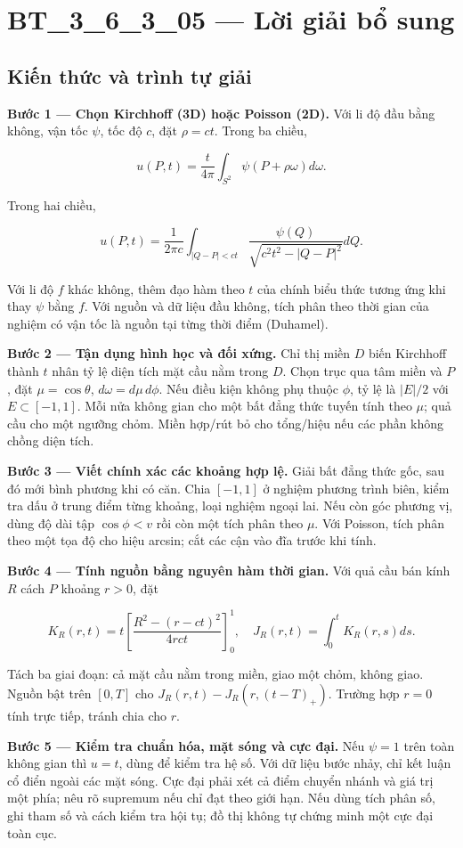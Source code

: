 \documentclass[10pt,a4paper]{article}
\begin{document}
\section*{BT\_3\_6\_3\_05 — Lời giải bổ sung}
\subsection*{Kiến thức và trình tự giải}
\textbf{Bước 1 — Chọn Kirchhoff (3D) hoặc Poisson (2D).} Với li độ đầu bằng không, vận tốc $\psi$, tốc độ $c$, đặt $\rho=ct$. Trong ba chiều,


\[
u(P,t)=\frac t{4\pi}\int_{S^2}\psi(P+\rho\omega)d\omega.
\]


Trong hai chiều,


\[
u(P,t)=\frac1{2\pi c}\int_{|Q-P|<ct}\frac{\psi(Q)}{\sqrt{c^2t^2-|Q-P|^2}}dQ.
\]


Với li độ $f$ khác không, thêm đạo hàm theo $t$ của chính biểu thức tương ứng khi thay $\psi$ bằng $f$. Với nguồn và dữ liệu đầu không, tích phân theo thời gian của nghiệm có vận tốc là nguồn tại từng thời điểm (Duhamel).

\textbf{Bước 2 — Tận dụng hình học và đối xứng.} Chỉ thị miền $D$ biến Kirchhoff thành $t$ nhân tỷ lệ diện tích mặt cầu nằm trong $D$. Chọn trục qua tâm miền và $P$, đặt $\mu=\cos\theta$, $d\omega=d\mu\,d\phi$. Nếu điều kiện không phụ thuộc $\phi$, tỷ lệ là $|E|/2$ với $E\subset[-1,1]$. Mỗi nửa không gian cho một bất đẳng thức tuyến tính theo $\mu$; quả cầu cho một ngưỡng chỏm. Miền hợp/rút bỏ cho tổng/hiệu nếu các phần không chồng diện tích.

\textbf{Bước 3 — Viết chính xác các khoảng hợp lệ.} Giải bất đẳng thức gốc, sau đó mới bình phương khi có căn. Chia $[-1,1]$ ở nghiệm phương trình biên, kiểm tra dấu ở trung điểm từng khoảng, loại nghiệm ngoại lai. Nếu còn góc phương vị, dùng độ dài tập $\cos\phi<v$ rồi còn một tích phân theo $\mu$. Với Poisson, tích phân theo một tọa độ cho hiệu arcsin; cắt các cận vào đĩa trước khi tính.

\textbf{Bước 4 — Tính nguồn bằng nguyên hàm thời gian.} Với quả cầu bán kính $R$ cách $P$ khoảng $r>0$, đặt


\[
K_R(r,t)=t\left[\frac{R^2-(r-ct)^2}{4rct}\right]_0^1,\quad J_R(r,t)=\int_0^tK_R(r,s)ds.
\]


Tách ba giai đoạn: cả mặt cầu nằm trong miền, giao một chỏm, không giao. Nguồn bật trên $[0,T]$ cho $J_R(r,t)-J_R(r,(t-T)_+)$. Trường hợp $r=0$ tính trực tiếp, tránh chia cho $r$.

\textbf{Bước 5 — Kiểm tra chuẩn hóa, mặt sóng và cực đại.} Nếu $\psi=1$ trên toàn không gian thì $u=t$, dùng để kiểm tra hệ số. Với dữ liệu bước nhảy, chỉ kết luận cổ điển ngoài các mặt sóng. Cực đại phải xét cả điểm chuyển nhánh và giá trị một phía; nêu rõ supremum nếu chỉ đạt theo giới hạn. Nếu dùng tích phân số, ghi tham số và cách kiểm tra hội tụ; đồ thị không tự chứng minh một cực đại toàn cục.
\end{document}
